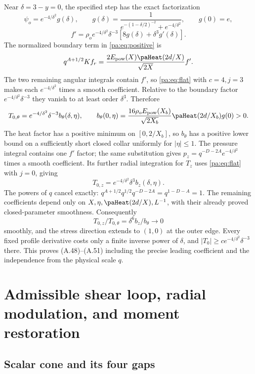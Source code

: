 \documentclass[10pt,a4paper]{article}
\begin{document}
Near $\delta=3-y=0$, the specified step has the exact factorization
\[
\psi_o=e^{-4/\delta^2}g(\delta),\qquad
g(\delta)=\frac1{e^{-(1-\delta/2)^{-2}}+e^{-4/\delta^2}},\qquad g(0)=e,
\]
\[
f'=\rho_oe^{-4/\delta^2}\delta^{-3}[8g(\delta)+\delta^3g'(\delta)].
\]
The normalized boundary term in \eqref{pa:eq:positive} is
\[
q^{A+1/2}Kf_r=\frac{2E_{\rm pow}(X)\paHeat(2d/X)}{\sqrt{2X}}f'.
\]
The two remaining angular integrals contain $f'$, so \eqref{pa:eq:flat} with
$c=4,j=3$ makes each $e^{-4/\delta^2}$ times a smooth coefficient.
Relative to the boundary factor $e^{-4/\delta^2}\delta^{-3}$ they vanish
to at least order $\delta^3$. Therefore
\[
T_{0,\theta}=e^{-4/\delta^2}\delta^{-3}b_\theta(\delta,\eta),\qquad
b_\theta(0,\eta)=\frac{16\rho_oE_{\rm pow}(X_b)}{\sqrt{2X_b}}
\paHeat(2d/X_b)g(0)>0.
\]
The heat factor has a positive minimum on $[0,2/X_b]$, so $b_\theta$
has a positive lower bound on a sufficiently short closed collar uniformly
for $|\eta|\le1$.
The pressure integral contains one $f'$ factor; the same substitution gives
$p_z=q^{-D-2A}e^{-4/\delta^2}$ times a smooth coefficient.
Its further radial integration for $T_z$ uses \eqref{pa:eq:flat} with $j=0$,
giving
\[
T_{0,z}=e^{-4/\delta^2}\delta^3b_z(\delta,\eta).
\]
The powers of $q$ cancel exactly:
$q^{A+1/2}q^{1/2}q^{-D-2A}=q^{1-D-A}=1$.
The remaining coefficients depend only on $X,\eta,\paHeat(2d/X),L^{-1}$,
with their already proved closed-parameter smoothness. Consequently
\[
T_{0,z}/T_{0,\theta}=\delta^6b_z/b_\theta\longrightarrow0
\]
smoothly, and the stress direction extends to $(1,0)$ at the outer edge.
Every fixed profile derivative costs only a finite inverse power of $\delta$,
and $|T_0|\ge ce^{-4/\delta^2}\delta^{-3}$ there.
This proves (A.48)--(A.51) including the precise leading coefficient and
the independence from the physical scale $q$.


\section{Admissible shear loop, radial modulation, and moment restoration}\label{pa:sec:component-loop}\label{pa:admissible-shear-loop-radial-modulation-and-moment-restoration}

\subsection{Scalar cone and its four gaps}\label{pa:scalar-cone-and-its-four-gaps}
\end{document}
